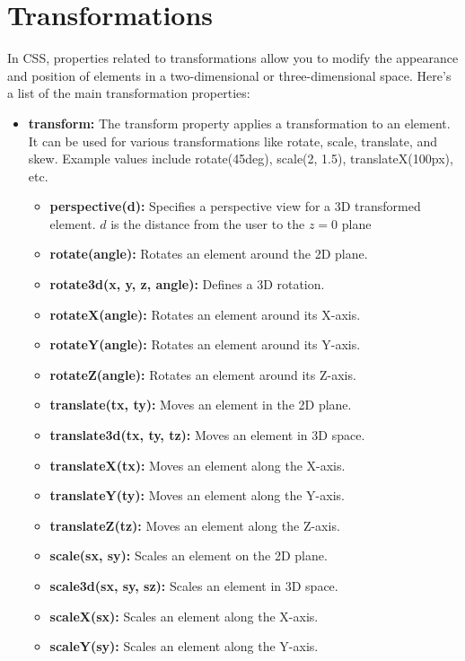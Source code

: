 \documentclass{report}
\begin{document}
    \section{\LARGE Transformations}
    \bigbreak \noindent 
    In CSS, properties related to transformations allow you to modify the appearance and position of elements in a two-dimensional or three-dimensional space. Here's a list of the main transformation properties:
    \begin{itemize}
        \item \textbf{transform:} The transform property applies a transformation to an element. It can be used for various transformations like rotate, scale, translate, and skew. Example values include rotate(45deg), scale(2, 1.5), translateX(100px), etc.
        \begin{itemize}
            \item \textbf{perspective(d):} Specifies a perspective view for a 3D transformed element. $d$ is the distance from the user to the $z=0$ plane
            \item \textbf{rotate(angle):} Rotates an element around the 2D plane.
            \item \textbf{rotate3d(x, y, z, angle):} Defines a 3D rotation.
            \item \textbf{rotateX(angle):} Rotates an element around its X-axis.
            \item \textbf{rotateY(angle):} Rotates an element around its Y-axis.
            \item \textbf{rotateZ(angle):} Rotates an element around its Z-axis.
            \item \textbf{translate(tx, ty):} Moves an element in the 2D plane.
            \item \textbf{translate3d(tx, ty, tz):} Moves an element in 3D space.
            \item \textbf{translateX(tx):} Moves an element along the X-axis.
            \item \textbf{translateY(ty):} Moves an element along the Y-axis.
            \item \textbf{translateZ(tz):} Moves an element along the Z-axis.
            \item \textbf{scale(sx, sy):} Scales an element on the 2D plane.
            \item \textbf{scale3d(sx, sy, sz):} Scales an element in 3D space.
            \item \textbf{scaleX(sx):} Scales an element along the X-axis.
            \item \textbf{scaleY(sy):} Scales an element along the Y-axis.

\end{itemize}
\end{itemize}
\end{document}
